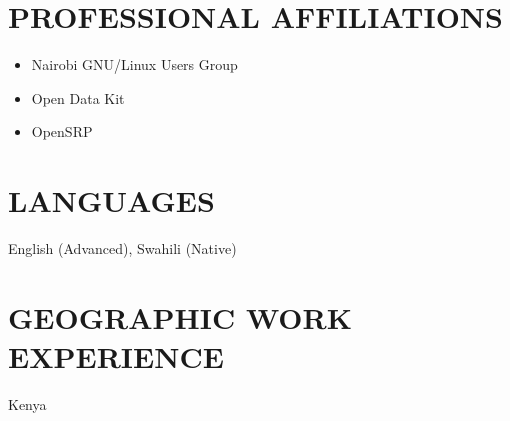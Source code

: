 \documentclass{res}
\begin{document}
\begin{resume}
\section{PROFESSIONAL AFFILIATIONS}
\begin{itemize} \itemsep -2pt
\item Nairobi GNU/Linux Users Group
\item Open Data Kit
\item OpenSRP
\end{itemize}

\section{LANGUAGES}
\begin{itemize} \itemsep -2pt
\vspace{8pt}
English (Advanced), Swahili (Native)
\end{itemize}

\section{GEOGRAPHIC WORK EXPERIENCE}
\begin{itemize} \itemsep -2pt
\vspace{8pt}
Kenya
\end{itemize}

 \end{resume}
\end{document}
